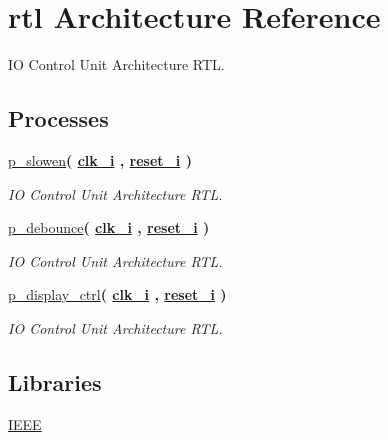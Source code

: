 \hypertarget{classio__ctrl_1_1rtl}{}\section{rtl Architecture Reference}
\label{classio__ctrl_1_1rtl}


IO Control Unit Architecture R\+TL.  


\subsection*{Processes}
 \begin{DoxyCompactItemize}
\item 
\hyperlink{classio__ctrl_1_1rtl_ae82c89fe12aec7f3a8a04e832dd5cc0e}{p\+\_\+slowen}{\bfseries  ( {\bfseries {\bfseries \hyperlink{classio__ctrl_abe949478e3f8aad0a6aeb1842fa6c608}{clk\+\_\+i}} \textcolor{vhdlchar}{ }} , {\bfseries {\bfseries \hyperlink{classio__ctrl_a55da7e76960757f8c6842e86a28ee7be}{reset\+\_\+i}} \textcolor{vhdlchar}{ }} )}
\begin{DoxyCompactList}\small\item\em IO Control Unit Architecture R\+TL. \end{DoxyCompactList}\item 
\hyperlink{classio__ctrl_1_1rtl_a627aed9352c04ffc84d1b682c4da9ba5}{p\+\_\+debounce}{\bfseries  ( {\bfseries {\bfseries \hyperlink{classio__ctrl_abe949478e3f8aad0a6aeb1842fa6c608}{clk\+\_\+i}} \textcolor{vhdlchar}{ }} , {\bfseries {\bfseries \hyperlink{classio__ctrl_a55da7e76960757f8c6842e86a28ee7be}{reset\+\_\+i}} \textcolor{vhdlchar}{ }} )}
\begin{DoxyCompactList}\small\item\em IO Control Unit Architecture R\+TL. \end{DoxyCompactList}\item 
\hyperlink{classio__ctrl_1_1rtl_a9adae6696d8563868e95204ecd77e739}{p\+\_\+display\+\_\+ctrl}{\bfseries  ( {\bfseries {\bfseries \hyperlink{classio__ctrl_abe949478e3f8aad0a6aeb1842fa6c608}{clk\+\_\+i}} \textcolor{vhdlchar}{ }} , {\bfseries {\bfseries \hyperlink{classio__ctrl_a55da7e76960757f8c6842e86a28ee7be}{reset\+\_\+i}} \textcolor{vhdlchar}{ }} )}
\begin{DoxyCompactList}\small\item\em IO Control Unit Architecture R\+TL. \end{DoxyCompactList}\end{DoxyCompactItemize}
\subsection*{Libraries}
 \begin{DoxyCompactItemize}
\item 
\hyperlink{classio__ctrl_1_1rtl_ae4f03c286607f3181e16b9aa12d0c6d4}{I\+E\+EE} 
\end{DoxyCompactItemize}
